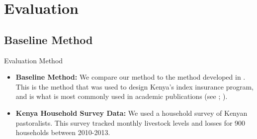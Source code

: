 \documentclass{beamer}
\begin{document}


     


\section{Evaluation}
\subsection{Baseline Method}
\begin{frame}{Evaluation Method}
    \begin{itemize}
        \setlength\itemsep{2em}
        \item \textbf{Baseline Method:} We compare our method to the method developed in \cite{chantarat2013designing}. This is the method that was used to design Kenya's index insurance program, and is what is most commonly used in academic publications (see \cite{flatnes2018improving}; \cite{jensen2019does}). 
        \item \textbf{Kenya Household Survey Data:} We used a household survey of Kenyan pastoralists. This survey tracked monthly livestock levels and losses for 900 households between 2010-2013. 
    \end{itemize}
\end{frame}
\end{document}
